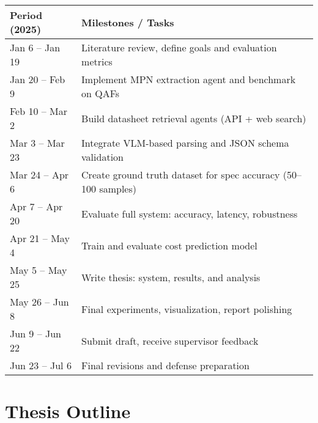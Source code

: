 \documentclass[11pt]{article}
\begin{document}
\begin{tabular}{ll}
\textbf{Period (2025)} & \textbf{Milestones / Tasks} \\
\hline
Jan 6 – Jan 19     & Literature review, define goals and evaluation metrics \\
Jan 20 – Feb 9     & Implement MPN extraction agent and benchmark on QAFs \\
Feb 10 – Mar 2     & Build datasheet retrieval agents (API + web search) \\
Mar 3 – Mar 23     & Integrate VLM-based parsing and JSON schema validation \\
Mar 24 – Apr 6     & Create ground truth dataset for spec accuracy (50–100 samples) \\
Apr 7 – Apr 20     & Evaluate full system: accuracy, latency, robustness \\
Apr 21 – May 4     & Train and evaluate cost prediction model \\
May 5 – May 25     & Write thesis: system, results, and analysis \\
May 26 – Jun 8     & Final experiments, visualization, report polishing \\
Jun 9 – Jun 22     & Submit draft, receive supervisor feedback \\
Jun 23 – Jul 6     & Final revisions and defense preparation \\
\end{tabular}


\section*{Thesis Outline}
\end{document}
